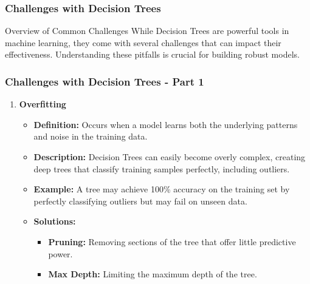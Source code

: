 \documentclass{beamer}
\begin{document}
\begin{frame}[fragile]
    \frametitle{Challenges with Decision Trees}
    \begin{block}{Overview of Common Challenges}
        While Decision Trees are powerful tools in machine learning, they come with several challenges that can impact their effectiveness. Understanding these pitfalls is crucial for building robust models.
    \end{block}
\end{frame}

\begin{frame}[fragile]
    \frametitle{Challenges with Decision Trees - Part 1}
    \begin{enumerate}
        \item \textbf{Overfitting}
        \begin{itemize}
            \item \textbf{Definition:} Occurs when a model learns both the underlying patterns and noise in the training data.
            \item \textbf{Description:} Decision Trees can easily become overly complex, creating deep trees that classify training samples perfectly, including outliers.
            \item \textbf{Example:} A tree may achieve 100\% accuracy on the training set by perfectly classifying outliers but may fail on unseen data.
            \item \textbf{Solutions:}
                \begin{itemize}
                    \item \textbf{Pruning:} Removing sections of the tree that offer little predictive power.
                    \item \textbf{Max Depth:} Limiting the maximum depth of the tree.
                \end{itemize}
        \end{itemize}
    \end{enumerate}
\end{frame}
\end{document}
